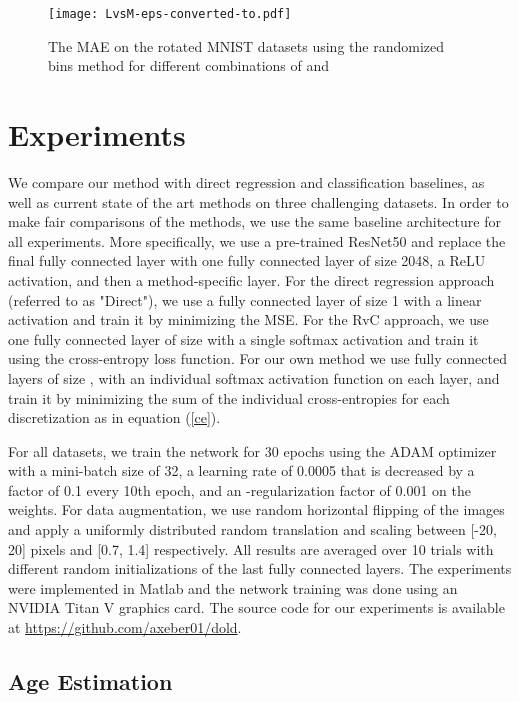 \documentclass[10pt, conference, a4paper]{IEEEtran}
\begin{document}
\begin{figure}[t]
  \centering
  \texttt{[image: LvsM-eps-converted-to.pdf]}
  \caption{The MAE on the rotated MNIST datasets using the randomized bins method for different combinations of  and }
\label{LvsM}
\end{figure}

\section{Experiments}
We compare our method with direct regression and classification baselines, as well as current state of the art methods on three challenging datasets. In order to make fair comparisons of the methods, we use the same baseline architecture for all experiments. More specifically, we use a pre-trained ResNet50 \cite{he2016deep} and replace the final fully connected layer with one fully connected layer of size 2048, a ReLU activation, and then a method-specific layer. For the direct regression approach (referred to as "Direct"), we use a fully connected layer of size 1 with a linear activation and train it by minimizing the MSE. For the RvC approach, we use one fully connected layer of size  with a single softmax activation and train it using the cross-entropy loss function. For our own method we use  fully connected layers of size , with an individual softmax activation function on each layer, and train it by minimizing the sum of the individual cross-entropies for each discretization as in equation (\ref{ce}).

For all datasets, we train the network for 30 epochs using the ADAM optimizer \cite{kingma2014adam} with a mini-batch size of 32, a learning rate of 0.0005 that is decreased by a factor of 0.1 every 10th epoch, and an -regularization factor of 0.001 on the weights. For data augmentation, we use random horizontal flipping of the images and apply a uniformly distributed random translation and scaling between [-20, 20] pixels and [0.7, 1.4] respectively. All results are averaged over 10 trials with different random initializations of the last fully connected layers. The experiments were implemented in Matlab and the network training was done using an NVIDIA Titan V graphics card. The source code for our experiments is available at \url{https://github.com/axeber01/dold}.

\subsection{Age Estimation}
\end{document}
